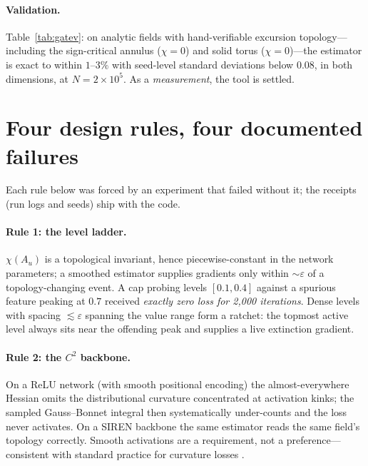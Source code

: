 \documentclass[10pt]{article}
\begin{document}
\paragraph{Validation.} Table~\ref{tab:gatev}: on analytic fields with
hand-verifiable excursion topology---including the sign-critical annulus ($\chi=0$)
and solid torus ($\chi=0$)---the estimator is exact to within $1$--$3\%$ with
seed-level standard deviations below $0.08$, in both dimensions, at
$N=2\times10^5$. As a \emph{measurement}, the tool is settled.

\begin{table}[t]
\centering
\caption{\textbf{Estimator validation} (3 seeds, $N=2\times10^5$,
$\varepsilon=0.02$). Fields decay below probed levels at the domain boundary, so no
Gauss--Bonnet boundary terms arise.}
\label{tab:gatev}

\end{table}

\section{Four design rules, four documented failures}
\label{sec:rules}

Each rule below was forced by an experiment that failed without it; the receipts (run
logs and seeds) ship with the code.

\paragraph{Rule 1: the level ladder.} $\chi(A_u)$ is a topological invariant, hence
piecewise-constant in the network parameters; a smoothed estimator supplies gradients
only within $\sim\varepsilon$ of a topology-changing event. A cap probing levels
$[0.1,0.4]$ against a spurious feature peaking at $0.7$ received \emph{exactly zero
loss for 2{,}000 iterations}. Dense levels with spacing $\lesssim\varepsilon$ spanning
the value range form a ratchet: the topmost active level always sits near the
offending peak and supplies a live extinction gradient.

\paragraph{Rule 2: the $C^2$ backbone.} On a ReLU network (with smooth positional
encoding) the almost-everywhere Hessian omits the distributional curvature
concentrated at activation kinks; the sampled Gauss--Bonnet integral then
systematically under-counts and the loss never activates. On a SIREN backbone the
same estimator reads the same field's topology correctly. Smooth activations are a
requirement, not a preference---consistent with standard practice for curvature
losses \citep{gropp2020igr,neurcadrecon2024}.
\end{document}
